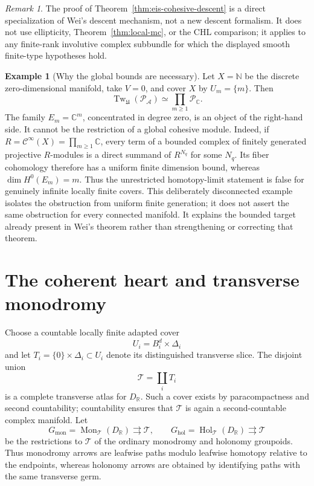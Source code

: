 \documentclass[12pt]{amsart}
\theoremstyle{definition}
\newtheorem{example}[thm]{Example}
\theoremstyle{remark}
\newtheorem{rem}[thm]{Remark}
\numberwithin{equation}{section}
\newcommand{\CA}{\mathcal A}
\newcommand{\C}{\mathbb C}
\newcommand{\R}{\mathbb R}
\newcommand{\cinf}{\mathcal C^\infty}
\begin{document}
\begin{rem}
The proof of Theorem~\ref{thm:eis-cohesive-descent} is a direct specialization
of Wei's descent mechanism, not a new descent formalism.  It does not use
ellipticity, Theorem~\ref{thm:local-mc}, or the CHL comparison; it applies to
any finite-rank involutive complex subbundle for which the displayed smooth
finite-type hypotheses hold.
\end{rem}

\begin{example}[Why the global bounds are necessary]
\label{ex:unbounded-descent}
Let \(X=\mathbb N\) be the discrete zero-dimensional manifold, take \(V=0\),
and cover \(X\) by \(U_m=\{m\}\).  Then
\[
\operatorname{Tw}_{\mathfrak U}(\mathcal P_{\CA})
\simeq
\prod_{m\geq1}\mathcal P_{\C}.
\]
The family \(E_m=\C^m\), concentrated in degree zero, is an object of the
right-hand side.  It cannot be the restriction of a global cohesive module.
Indeed, if \(R=\cinf(X)=\prod_{m\geq1}\C\), every term of a bounded complex
of finitely generated projective \(R\)-modules is a direct summand of
\(R^{N_q}\) for some \(N_q\).  Its fiber cohomology therefore has a uniform
finite dimension bound, whereas \(\dim H^0(E_m)=m\).  Thus the unrestricted
homotopy-limit statement is false for genuinely infinite locally finite
covers.  This deliberately disconnected example isolates the obstruction
from uniform finite generation; it does not assert the same obstruction for
every connected manifold.  It explains the bounded target already present
in Wei's theorem rather than strengthening or correcting that theorem.
\end{example}

\section{The coherent heart and transverse monodromy}
\label{sec:coherent-monodromy}

Choose a countable locally finite adapted cover
\[
U_i=B_i^d\times\Delta_i
\]
and let \(T_i=\{0\}\times\Delta_i\subset U_i\) denote its distinguished
transverse slice.  The disjoint union
\[
\mathcal T=\coprod_iT_i
\]
is a complete transverse atlas for \(D_{\R}\).  Such a cover exists by
paracompactness and second countability; countability ensures that
\(\mathcal T\) is again a second-countable complex manifold.  Let
\[
G_{\mathrm{mon}}
=
\operatorname{Mon}_{\mathcal T}(D_{\R})
\rightrightarrows\mathcal T,
\qquad
G_{\mathrm{hol}}
=
\operatorname{Hol}_{\mathcal T}(D_{\R})
\rightrightarrows\mathcal T
\]
be the restrictions to \(\mathcal T\) of the ordinary monodromy and
holonomy groupoids.  Thus monodromy arrows are leafwise paths modulo
leafwise homotopy relative to the endpoints, whereas holonomy arrows are
obtained by identifying paths with the same transverse germ.
\end{document}
